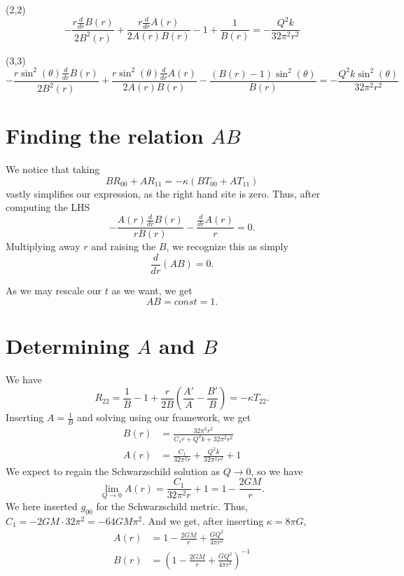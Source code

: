 \documentclass{article}
\begin{document}
(2,2)
$$
\displaystyle - \frac{r \frac{d}{d r} B{\left(r \right)}}{2 B^{2}{\left(r \right)}} + \frac{r \frac{d}{d r} A{\left(r \right)}}{2 A{\left(r \right)} B{\left(r \right)}} - 1 + \frac{1}{B{\left(r \right)}} = -\frac{Q^{2} k}{32 \pi^{2} r^{2}}
$$

(3,3)
$$
\displaystyle - \frac{r \sin^{2}{\left(\theta \right)} \frac{d}{d r} B{\left(r \right)}}{2 B^{2}{\left(r \right)}} + \frac{r \sin^{2}{\left(\theta \right)} \frac{d}{d r} A{\left(r \right)}}{2 A{\left(r \right)} B{\left(r \right)}} - \frac{\left(B{\left(r \right)} - 1\right) \sin^{2}{\left(\theta \right)}}{B{\left(r \right)}} = -\frac{Q^{2} k \sin^{2}{\left(\theta \right)}}{32 \pi^{2} r^{2}}
$$

\section{Finding the relation $AB$}
We notice that taking
$$
B R_{00} + A R_{11} = -\kappa ( B T_{00} + A T_{11})
$$
vastly simplifies our expression, as the right hand site is zero.
Thus, after computing the LHS
$$
\displaystyle - \frac{A{\left(r \right)} \frac{d}{d r} B{\left(r \right)}}{r B{\left(r \right)}} - \frac{\frac{d}{d r} A{\left(r \right)}}{r} = 0.
$$
Multiplying away $r$ and raising the $B$, we recognize this as simply
$$
\frac{d}{dr} \left( AB \right) = 0.
$$

As we may rescale our $t$ as we want, we get
$$
AB = const = 1.
$$

\section{Determining $A$ and $B$}
We have
$$
R_{22} = \frac1B - 1 + \frac{r}{2B} (\frac{A'}{A} - \frac{B'}{B}) = - \kappa T_{22}.
$$
Inserting $A=\frac1B$ and solving using our framework, we get
\begin{align*}
  B{\left(r \right)} &= \frac{32 \pi^{2} r^{2}}{C_{1} r + Q^{2} k + 32 \pi^{2} r^{2}} \\
  A{\left(r \right)} &= \displaystyle \frac{C_{1}}{32 \pi^{2} r} + \frac{Q^{2} k}{32 \pi^{2} r^{2}} + 1
\end{align*}
We expect to regain the Schwarzschild solution as $Q \rightarrow 0$, so we have
$$
\lim_{Q\rightarrow 0} A{\left(r \right)} =  \frac{C_{1}}{32 \pi^{2} r} + 1 = 1 -\frac{2GM}{r}.
$$
We here inserted $g_{00}$ for the Schwarzschild metric.
Thus, $C_1 = - 2GM \cdot 32\pi^2 = -64 G M \pi^2$.
And we get, after inserting $\kappa = 8 \pi G$,
\begin{align*}
A(r) &=  1 - \frac{2 G M}{r} + \frac{G Q^{2}}{4 \pi r^{2}}\\
B(r) &=  \left(1 - \frac{2 G M}{r} + \frac{G Q^{2}}{4 \pi r^{2}} \right)^{-1}\\
\end{align*}
\end{document}
